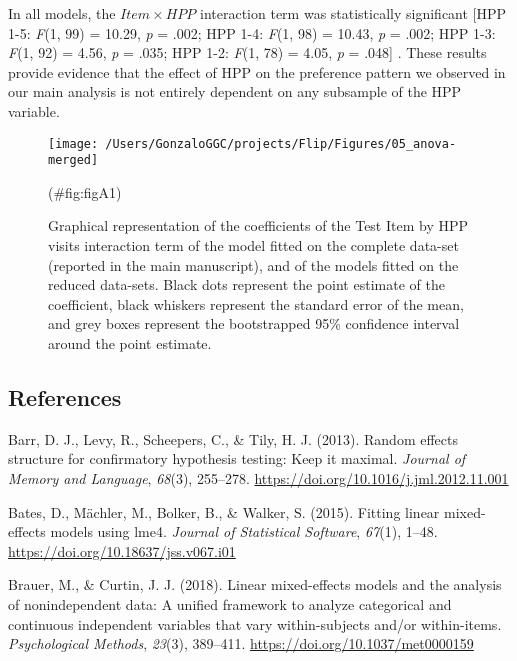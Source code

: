 \begin{appendix}
In all models, the \(Item \times HPP\) interaction term was
statistically significant {[}HPP 1-5: \emph{F}(1, 99) = 10.29, \emph{p}
= .002; HPP 1-4: \emph{F}(1, 98) = 10.43, \emph{p} = .002; HPP 1-3:
\emph{F}(1, 92) = 4.56, \emph{p} = .035; HPP 1-2: \emph{F}(1, 78) =
4.05, \emph{p} = .048{]} . These results provide evidence that the
effect of HPP on the preference pattern we observed in our main analysis
is not entirely dependent on any subsample of the HPP variable.

\begin{figure}
\texttt{[image: /Users/GonzaloGGC/projects/Flip/Figures/05\_anova-merged]} \caption{Graphical representation of the coefficients of the Test Item by HPP visits interaction term of the model fitted on the complete data-set (reported in the main manuscript), and of the models fitted on the reduced data-sets. Black dots represent the point estimate of the coefficient, black whiskers represent the standard error of the mean, and grey boxes represent the bootstrapped 95\% confidence interval around the point estimate.}(\#fig:figA1)
\end{figure}

\newpage

\hypertarget{references}{%
\subsection{References}\label{references}}

\begingroup
\setlength{\parindent}{-0.5in}
\setlength{\leftskip}{0.5in}

\hypertarget{refs}{}
\leavevmode\hypertarget{ref-barr2013}{}%
Barr, D. J., Levy, R., Scheepers, C., \& Tily, H. J. (2013). Random
effects structure for confirmatory hypothesis testing: Keep it maximal.
\emph{Journal of Memory and Language}, \emph{68}(3), 255--278.
\url{https://doi.org/10.1016/j.jml.2012.11.001}

\leavevmode\hypertarget{ref-bates2015}{}%
Bates, D., Mächler, M., Bolker, B., \& Walker, S. (2015). Fitting linear
mixed-effects models using lme4. \emph{Journal of Statistical Software},
\emph{67}(1), 1--48. \url{https://doi.org/10.18637/jss.v067.i01}

\leavevmode\hypertarget{ref-brauer2018}{}%
Brauer, M., \& Curtin, J. J. (2018). Linear mixed-effects models and the
analysis of nonindependent data: A unified framework to analyze
categorical and continuous independent variables that vary
within-subjects and/or within-items. \emph{Psychological Methods},
\emph{23}(3), 389--411. \url{https://doi.org/10.1037/met0000159}


\end{appendix}
